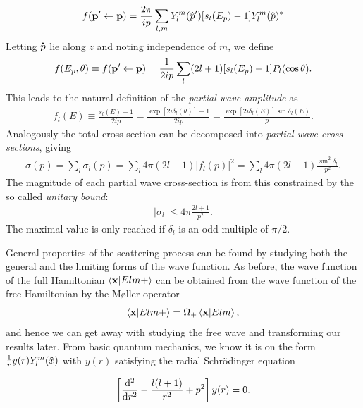 \begin{align*}
  f(\vb{p}^{\prime}\leftarrow\vb{p}) = \frac{2\pi}{ip}\sum_{l,m}Y_{l}^{m}(\mathbf{\hat{\text{$p$}}}^{\prime})[s_{l}(E_{p})-1]Y^{m}_{l}(\mathbf{\hat{\text{$p$}}})^{*}
\end{align*}
Letting \(\mathbf{\hat{\text{$p$}}}\) lie along \(z\) and noting independence of \(m\), we
define
\begin{align*}
  f(E_{p},\theta) \equiv f(\vb{p}^{\prime}\leftarrow\vb{p})=\frac{1}{2ip}\sum_{l}(2l+1)[s_{l}(E_{p})-1]P_{l}(\cos\theta).
\end{align*}
This leads to the natural definition of the \textit{partial wave amplitude} as
\begin{align*}
  f_{l}(E) \equiv \frac{s_{l}(E)-1}{2ip} = \frac{\exp[ 2i\delta_{l}(\theta)] - 1}{2ip} = \frac{\exp[2i\delta_{l}(E)]\sin\delta_{l}(E)}{p}.
\end{align*}
Analogously the total cross-section can be decomposed into \textit{partial wave
  cross-sections}, giving
\begin{align*}
  \sigma(p) = \sum_{l}\sigma_{l}(p) = \sum_{l}4\pi(2l+1)\left| f_{l}(p) \right|^{2} = \sum_{l}4\pi(2l+1)\frac{\sin^{2}\delta_{l}}{p^{2}}.
\end{align*}
The magnitude of each partial wave cross-section is from this constrained by the
so called \textit{unitary bound}: 
\begin{align*}
  |\sigma_{l}| \leq 4\pi\frac{2l+1}{p^{2}}.
\end{align*}
The maximal value is only reached if
\(\delta_{l}\) is an odd multiple of \(\pi/2\).

General properties of the scattering process can be found by studying both the
general and the limiting forms of the wave function. As before, the wave
function of the full Hamiltonian
\(\ip{\vb{x}}{Elm+}\) can be obtained from the wave function of the free Hamiltonian by the Møller operator
\begin{equation*}
  \ip{\vb{x}}{Elm+} = \Omega_{+}\ip{\vb{x}}{Elm},
\end{equation*}
and hence we can get away with studying the free wave and transforming our
results later. From basic quantum
mechanics, we know it is on the form
\(\frac{1}{r}y(r)Y^{m}_{l}(\mathbf{\hat{\text{$x$}}})\) with \(y(r)\) satisfying the radial
Schr\"odinger equation

\begin{equation*}
  \left[ \dv[2]{r} - \frac{l(l+1)}{r^{2}}+p^{2}\right]y(r) = 0.
\end{equation*}
\newcommand{\rbf}{\hat{j}_l(z)}

